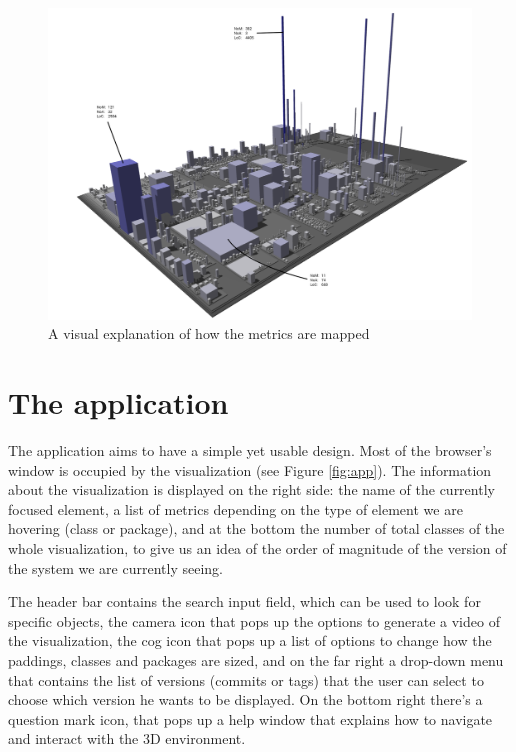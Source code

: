 \documentclass[]{usiinfbachelorproject}
\begin{document}
\begin{figure} [H]
\centering
\includegraphics[width=1\textwidth]{pictures/metrics.png}
\caption{A visual explanation of how the metrics are mapped}
\label{fig:metrics}
\end{figure}



\section{The application} \label{WebCity}

The application aims to have a simple yet usable design. Most of the browser's window is occupied by the visualization (see Figure \ref{fig:app}). The information about the visualization is displayed on the right side: the name of the currently focused element, a list of metrics depending on the type of element we are hovering (class or package),
and at the bottom the number of total classes of the whole visualization, to give us an idea of the order of magnitude of the version of the system we are currently seeing.

The header bar contains the search input field, which can be used to look for specific objects, the camera icon that pops up the options to generate a video of the visualization, the cog icon that pops up a list of options to change how the paddings, classes and packages are sized, and on the far right a drop-down menu that contains the list of versions (commits or tags) that the user can select to choose which version he wants to be displayed.
On the bottom right there's a question mark icon, that pops up a help window that explains how to navigate and interact with the 3D environment.
\end{document}
